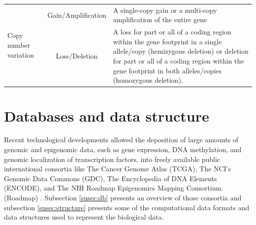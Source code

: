 \begin{landscape}
\begin{table}[]
\begin{tabular}{p{4cm}c|p{13cm}}
\multicolumn{1}{l|}{\multirow{2}{*}{Copy number variation}} & Gain/Amplification
 & A single-copy gain or a multi-copy amplification of the entire gene  \\  \cline{2-3}
\multicolumn{1}{l|}{}  & Loss/Deletion  &
A loss  for part or all of a coding region within the gene footprint in a single allele/copy (hemizygous deletion) or deletion  for part or all of a coding region within the gene footprint in both alleles/copies (homozygous deletion). \cite{comis_cnv} \\\hline
\end{tabular}
 \end{table}
 \egroup
 \end{landscape}

 \section{Databases and data structure} \label{sec:concept-data}

 Recent technological developments allowed the deposition of large amounts of genomic and epigenomic data, such as gene expression, DNA methylation, and genomic localization of transcription factors, into freely available public international consortia like The Cancer Genome Atlas (TCGA), The NCI's Genomic Data Commons (GDC), The Encyclopedia of DNA Elements (ENCODE), and The NIH Roadmap Epigenomics Mapping Consortium (Roadmap) \cite{Hawkins}.
 Subsection \ref{susec:db} presents an overview of those consortia and subsection  \ref{susec:structure} presents
 some of the computational data formats and data structures used to represent the biological data.

